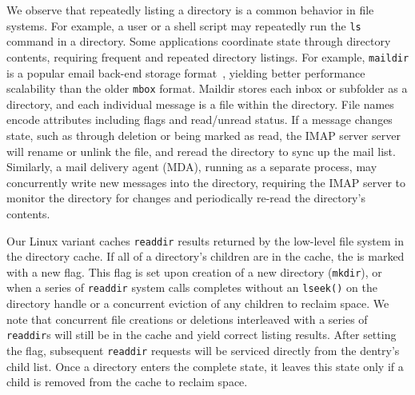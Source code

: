 We observe that repeatedly listing a directory is a common behavior
in file systems.
For example,
a user or a shell script may repeatedly run the {\tt ls} command
in a directory.
Some applications coordinate state through directory contents,
requiring frequent and repeated directory listings.
For example, {\tt maildir} is a popular email back-end storage format~\citep{maildir},
yielding better performance scalability than the older {\tt mbox} format.
Maildir stores each inbox or subfolder as a directory,
and each individual message is a file within the directory.
File names encode attributes including  flags and read/unread status.
If a message changes state, such as through deletion or being marked as read,
the IMAP server server will rename or unlink the file, and reread the directory to
sync up the mail list. 
Similarly, a mail delivery agent (MDA), running as a separate process, 
may concurrently write new messages into the directory, requiring the IMAP server
to monitor the directory for changes and  periodically re-read the directory's contents.


Our Linux variant caches {\tt readdir} results returned by the low-level file system
in the directory cache.
If all of a directory's children are in the cache,
the \dentry{} is marked with a new \completeflag{} flag.
This flag is set upon creation of a new directory ({\tt mkdir}),
or when a series of {\tt readdir} system calls completes without  an {\tt lseek()} on the directory handle
or a concurrent eviction of any children to reclaim space.
We note that concurrent file creations or deletions interleaved  with a series of {\tt readdir}s
will still be in the cache and yield correct listing results.
After setting the \completeflag{} flag, subsequent {\tt readdir} requests
will be serviced directly from the dentry's child list.
Once a directory enters the complete state, it leaves this state only 
if a child \dentry{} is removed from the cache to reclaim space.

